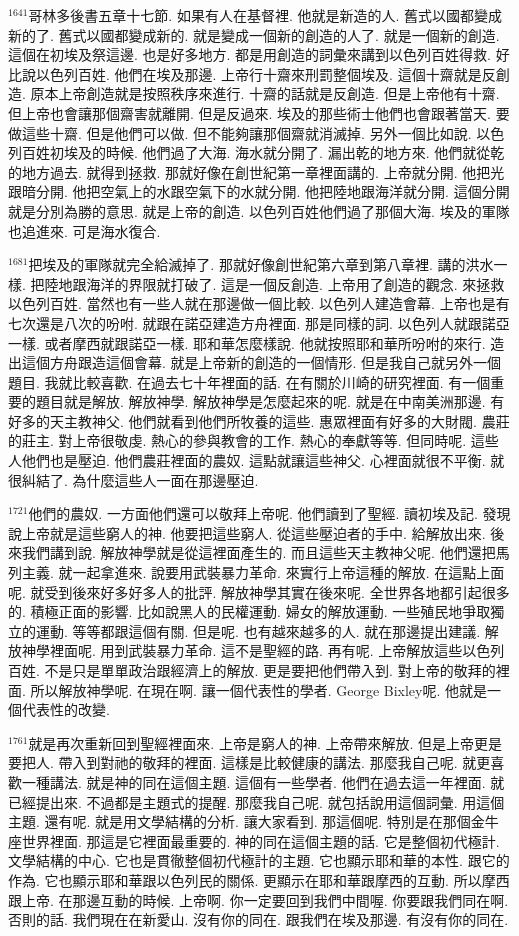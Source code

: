 \documentclass{book}
\begin{document}
$^{1641}$哥林多後書五章十七節.
如果有人在基督裡.
他就是新造的人.
舊式以國都變成新的了.
舊式以國都變成新的.
就是變成一個新的創造的人了.
就是一個新的創造.
這個在初埃及祭這邊.
也是好多地方.
都是用創造的詞彙來講到以色列百姓得救.
好比說以色列百姓.
他們在埃及那邊.
上帝行十齋來刑罰整個埃及.
這個十齋就是反創造.
原本上帝創造就是按照秩序來進行.
十齋的話就是反創造.
但是上帝他有十齋.
但上帝也會讓那個齋害就離開.
但是反過來.
埃及的那些術士他們也會跟著當天.
要做這些十齋.
但是他們可以做.
但不能夠讓那個齋就消滅掉.
另外一個比如說.
以色列百姓初埃及的時候.
他們過了大海.
海水就分開了.
漏出乾的地方來.
他們就從乾的地方過去.
就得到拯救.
那就好像在創世紀第一章裡面講的.
上帝就分開.
他把光跟暗分開.
他把空氣上的水跟空氣下的水就分開.
他把陸地跟海洋就分開.
這個分開就是分別為勝的意思.
就是上帝的創造.
以色列百姓他們過了那個大海.
埃及的軍隊也追進來.
可是海水復合.

$^{1681}$把埃及的軍隊就完全給滅掉了.
那就好像創世紀第六章到第八章裡.
講的洪水一樣.
把陸地跟海洋的界限就打破了.
這是一個反創造.
上帝用了創造的觀念.
來拯救以色列百姓.
當然也有一些人就在那邊做一個比較.
以色列人建造會幕.
上帝也是有七次還是八次的吩咐.
就跟在諾亞建造方舟裡面.
那是同樣的詞.
以色列人就跟諾亞一樣.
或者摩西就跟諾亞一樣.
耶和華怎麼樣說.
他就按照耶和華所吩咐的來行.
造出這個方舟跟造這個會幕.
就是上帝新的創造的一個情形.
但是我自己就另外一個題目.
我就比較喜歡.
在過去七十年裡面的話.
在有關於川崎的研究裡面.
有一個重要的題目就是解放.
解放神學.
解放神學是怎麼起來的呢.
就是在中南美洲那邊.
有好多的天主教神父.
他們就看到他們所牧養的這些.
惠眾裡面有好多的大財閥.
農莊的莊主.
對上帝很敬虔.
熱心的參與教會的工作.
熱心的奉獻等等.
但同時呢.
這些人他們也是壓迫.
他們農莊裡面的農奴.
這點就讓這些神父.
心裡面就很不平衡.
就很糾結了.
為什麼這些人一面在那邊壓迫.

$^{1721}$他們的農奴.
一方面他們還可以敬拜上帝呢.
他們讀到了聖經.
讀初埃及記.
發現說上帝就是這些窮人的神.
他要把這些窮人.
從這些壓迫者的手中.
給解放出來.
後來我們講到說.
解放神學就是從這裡面產生的.
而且這些天主教神父呢.
他們還把馬列主義.
就一起拿進來.
說要用武裝暴力革命.
來實行上帝這種的解放.
在這點上面呢.
就受到後來好多好多人的批評.
解放神學其實在後來呢.
全世界各地都引起很多的.
積極正面的影響.
比如說黑人的民權運動.
婦女的解放運動.
一些殖民地爭取獨立的運動.
等等都跟這個有關.
但是呢.
也有越來越多的人.
就在那邊提出建議.
解放神學裡面呢.
用到武裝暴力革命.
這不是聖經的路.
再有呢.
上帝解放這些以色列百姓.
不是只是單單政治跟經濟上的解放.
更是要把他們帶入到.
對上帝的敬拜的裡面.
所以解放神學呢.
在現在啊.
讓一個代表性的學者.
George Bixley呢.
他就是一個代表性的改變.

$^{1761}$就是再次重新回到聖經裡面來.
上帝是窮人的神.
上帝帶來解放.
但是上帝更是要把人.
帶入到對祂的敬拜的裡面.
這樣是比較健康的講法.
那麼我自己呢.
就更喜歡一種講法.
就是神的同在這個主題.
這個有一些學者.
他們在過去這一年裡面.
就已經提出來.
不過都是主題式的提醒.
那麼我自己呢.
就包括說用這個詞彙.
用這個主題.
還有呢.
就是用文學結構的分析.
讓大家看到.
那這個呢.
特別是在那個金牛座世界裡面.
那這是它裡面最重要的.
神的同在這個主題的話.
它是整個初代極計.
文學結構的中心.
它也是貫徹整個初代極計的主題.
它也顯示耶和華的本性.
跟它的作為.
它也顯示耶和華跟以色列民的關係.
更顯示在耶和華跟摩西的互動.
所以摩西跟上帝.
在那邊互動的時候.
上帝啊.
你一定要回到我們中間喔.
你要跟我們同在啊.
否則的話.
我們現在在新愛山.
沒有你的同在.
跟我們在埃及那邊.
有沒有你的同在.
\end{document}
